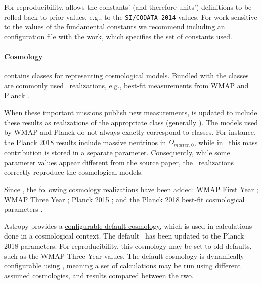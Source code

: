 \documentclass[modern]{aastex631}
\begin{document}
For reproducibility, \astropypkg allows the constants' (and therefore units')
definitions to be rolled back to prior values, e.g., to the \texttt{SI/CODATA
2014} values. For work sensitive to the values of the fundamental constants we
recommend including an \astropy configuration file with the work, which
specifies the set of constants used.

\paragraph{Cosmology}

\astropycosmology contains classes for representing cosmological models. Bundled
with the classes are commonly used \astropyCosmology\ realizations, e.g.,
best-fit measurements from
\href{https://lambda.gsfc.nasa.gov/product/map/current/}{WMAP}
\citep{WMAP2003} and
\href{https://www.nasa.gov/mission_pages/planck}{Planck}
\citep{PlanckMission:2006}.

When these important missions publish new measurements, \astropycosmology is
updated to include these results as realizations of the appropriate class
(generally \astropyFlatLambdaCDM). The models used by WMAP and Planck do not
always exactly correspond to \astropycosmology classes. For instance, the Planck
2018 results \citep{Planck2018VI:2020} include massive neutrinos in
$\Omega_{matter,0}$, while in \astropyFlatLambdaCDM\ this mass contribution is
stored in a separate parameter. Consequently, while some parameter values appear
different from the source paper, the \astropyCosmology\ realizations correctly
reproduce the cosmological models.

Since \citet{astropy:2018}, the following cosmology realizations have been
added:
\href{http://docs.astropy.org/en/stable/api/astropy.cosmology.WMAP1.html}{WMAP First Year}
\citep{WMAP1Year:2003};
\href{http://docs.astropy.org/en/stable/api/astropy.cosmology.WMAP3.html}{WMAP
Three Year} \citep{WMAP3Year:2007};
\href{http://docs.astropy.org/en/stable/api/astropy.cosmology.Planck15.html}{Planck 2015}
\citep{Planck2015XIII:2016}; and the
\href{http://docs.astropy.org/en/stable/api/astropy.cosmology.Planck18.html}{Planck
2018} best-fit cosmological parameters \citep{Planck2018VI:2020}.

Astropy provides a
\href{http://docs.astropy.org/en/stable/api/astropy.cosmology.default_cosmology.html}{configurable
default cosmology}, which is used in calculations done in a cosmological
context. The default \astropyCosmology\ has been updated to the Planck 2018
parameters. For reproducibility, this cosmology may be set to old defaults, such
as the WMAP Three Year values. The default cosmology is dynamically configurable
using \astropyScienceState, meaning a set of calculations may be run using
different assumed cosmologies, and results compared between the two.
\end{document}
